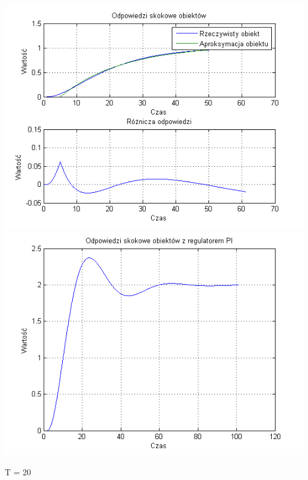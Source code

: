 \documentclass[10pt,a4paper]{article}
\begin{document}
\begin{center}
\includegraphics[scale=1]{images/jeden/skrypt_73.png}\\
\includegraphics[scale=1]{images/jeden/skrypt_74.png}\\
\end{center}
\newpage
T = 20
\end{document}
